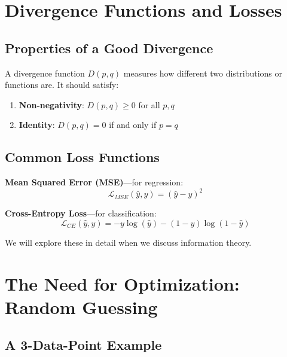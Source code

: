 
\section{Divergence Functions and Losses}

\subsection{Properties of a Good Divergence}

A divergence function $D(p, q)$ measures how different two distributions or functions are. It should satisfy:

\begin{enumerate}
    \item \textbf{Non-negativity}: $D(p, q) \geq 0$ for all $p, q$
    \item \textbf{Identity}: $D(p, q) = 0$ if and only if $p = q$
\end{enumerate}

\subsection{Common Loss Functions}

\textbf{Mean Squared Error (MSE)}---for regression:
\[
\mathcal{L}_{MSE}(\hat{y}, y) = (\hat{y} - y)^2
\]

\textbf{Cross-Entropy Loss}---for classification:
\[
\mathcal{L}_{CE}(\hat{y}, y) = -y \log(\hat{y}) - (1-y) \log(1-\hat{y})
\]

We will explore these in detail when we discuss information theory.


\section{The Need for Optimization: Random Guessing}

\subsection{A 3-Data-Point Example}

